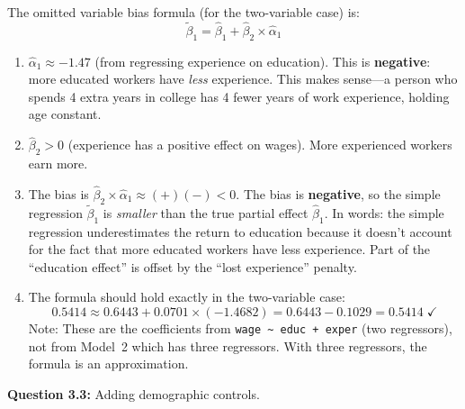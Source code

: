 \documentclass[11pt,letterpaper]{article}
\begin{document}
\begin{answer}
The omitted variable bias formula (for the two-variable case) is:
\[
\tilde{\beta}_1 = \hat{\beta}_1 + \hat{\beta}_2 \times \hat{\alpha}_1
\]

\begin{enumerate}[label=(\alph*)]
\item $\hat{\alpha}_1 \approx -1.47$ (from regressing experience on education). This is \textbf{negative}: more educated workers have \textit{less} experience. This makes sense---a person who spends 4 extra years in college has 4 fewer years of work experience, holding age constant.

\item $\hat{\beta}_2 > 0$ (experience has a positive effect on wages). More experienced workers earn more.

\item The bias is $\hat{\beta}_2 \times \hat{\alpha}_1 \approx (+)(-)  < 0$. The bias is \textbf{negative}, so the simple regression $\tilde{\beta}_1$ is \textit{smaller} than the true partial effect $\hat{\beta}_1$. In words: the simple regression underestimates the return to education because it doesn't account for the fact that more educated workers have less experience. Part of the ``education effect'' is offset by the ``lost experience'' penalty.

\item The formula should hold exactly in the two-variable case:
\[
0.5414 \approx 0.6443 + 0.0701 \times (-1.4682) = 0.6443 - 0.1029 = 0.5414 \;\checkmark
\]
Note: These are the coefficients from \texttt{wage \~{} educ + exper} (two regressors), not from Model~2 which has three regressors. With three regressors, the formula is an approximation.
\end{enumerate}
\end{answer}

\textbf{Question 3.3:} Adding demographic controls.
\end{document}
